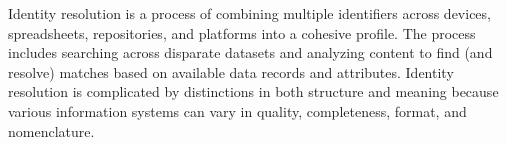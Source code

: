 %
%
Identity resolution is a process of combining multiple identifiers across devices, spreadsheets, repositories, and
platforms into a cohesive profile.
The process includes searching across disparate datasets and analyzing content to find (and resolve) matches based
on available data records and attributes.
Identity resolution is complicated by distinctions in both structure and meaning because various information systems
can vary in quality, completeness, format, and nomenclature.

